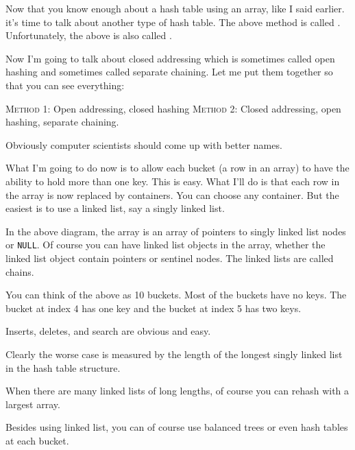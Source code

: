 
Now that you know enough about a hash table using an array,
like I said earlier. it's time to talk about another type of hash table.
The above method is called .
Unfortunately, the above is also called .

Now I'm going to talk about closed addressing which is sometimes called
open hashing and sometimes called separate chaining.
Let me put them together so that you can see everything:
\begin{tightlist}
\li \textsc{Method 1}: Open addressing, closed hashing
\li \textsc{Method 2}: Closed addressing, open hashing, separate chaining.
\end{tightlist}
Obviously computer scientists should come up with better
names.

What I'm going to do now is to allow each bucket
(a row in an array) to have the ability to hold more than one key.
This is easy.
What I'll do is that each row in the array is now replaced by 
containers.
You can choose any container.
But the easiest is to use a linked list, say a singly linked list.


In the above diagram, the array is an array of pointers to singly linked list nodes
or \verb!NULL!.
Of course you can have linked list objects in the array, 
whether the linked list object contain pointers or sentinel nodes.
The linked lists are called chains.

You can think of the above as 10 buckets.
Most of the buckets have no keys.
The bucket at index 4 has one key
and the bucket at index 5 has two keys.

Inserts, deletes, and search are obvious and easy.

Clearly the worse case is measured by the length of the longest singly
linked list in the hash table structure.

When there are many linked lists of long lengths,
of course you can rehash with a largest array.

Besides using linked list, you can of course use balanced trees or even
hash tables at each bucket.



\newpage
